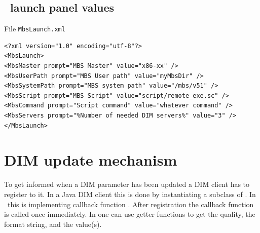 \subsection{\mbs\ launch panel values}
File {\tt MbsLaunch.xml}
{\small \begin{verbatim}
<?xml version="1.0" encoding="utf-8"?>
<MbsLaunch>
<MbsMaster prompt="MBS Master" value="x86-xx" />
<MbsUserPath prompt="MBS User path" value="myMbsDir" />
<MbsSystemPath prompt="MBS system path" value="/mbs/v51" />
<MbsScript prompt="MBS Script" value="script/remote_exe.sc" />
<MbsCommand prompt="Script command" value="whatever command" />
<MbsServers prompt="%Number of needed DIM servers%" value="3" />
</MbsLaunch>
\end{verbatim}
}
\section{DIM update mechanism}
To get informed when a DIM parameter has been updated a DIM client has to register to it.
In a Java DIM client this is done by instantiating a subclass of .
In \gui\ this is  implementing callback function .
After registration the callback function is called once immediately.
In  one can use getter functions to get the quality, the format string,
and the value(s).
